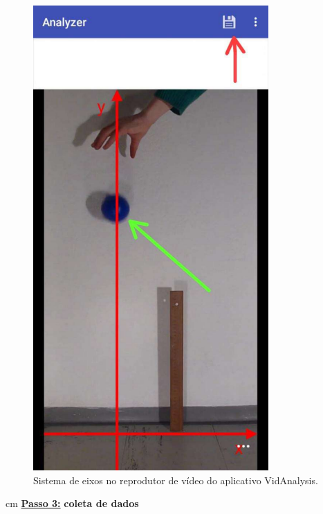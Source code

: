 \documentclass[12pt]{article}
\begin{document}
\begin{figure}[h!]
\includegraphics[width=9cm]{imagenapendicec4.pdf}
\caption{Sistema de eixos no reprodutor de vídeo do aplicativo VidAnalysis.}
\label{apendice4c}
\end{figure}
\par
{} cm
\underline{\bf Passo 3:} {\bf coleta de dados}\\
\indent
\end{document}
